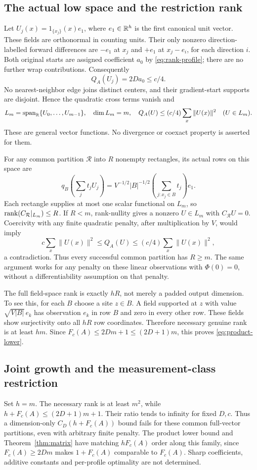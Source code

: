 \subsection{The actual low space and the restriction rank}
Let $U_j(x)=1_{\{x_j\}}(x)e_1$, where $e_1\in\mathbb R^h$ is the first
canonical unit vector. These fields are orthonormal in counting units.
Their only nonzero direction-labelled forward differences are $-e_1$ at
$x_j$ and $+e_1$ at $x_j-e_i$, for each direction $i$. Both original
starts are assigned coefficient $a_0$ by \eqref{eq:rank-profile}; there
are no further wrap contributions. Consequently
\[
 Q_A(U_j)=2Da_0\le c/4.
\]
No nearest-neighbor edge joins distinct centers, and their gradient-start
supports are disjoint. Hence the quadratic cross terms vanish and
\begin{equation}\label{eq:rank-lowspace}
 L_m=\operatorname{span}_{\mathbb R}\{U_0,\ldots,U_{m-1}\},\quad
 \dim L_m=m,\quad
 Q_A(U)\le(c/4)\sum_x\|U(x)\|^2\quad(U\in L_m).
\end{equation}
These are general vector functions. No divergence or coexact property is
asserted for them.

For any common partition $\mathcal R$ into $R$ nonempty rectangles, its
actual rows on this space are
\[
 q_B\left(\sum_jt_jU_j\right)
 =V^{-1/2}|B|^{-1/2}
       \left(\sum_{j:x_j\in B}t_j\right)e_1.
\]
Each rectangle supplies at most one scalar functional on $L_m$, so
$\operatorname{rank}(C_{\mathcal R}|_{L_m})\le R$. If $R<m$, rank-nullity gives a
nonzero $U\in L_m$ with $C_{\mathcal R}U=0$. Coercivity with any finite
quadratic penalty, after multiplication by $V$, would imply
\[
 c\sum_x\|U(x)\|^2\le Q_A(U)
                    \le(c/4)\sum_x\|U(x)\|^2,
\]
a contradiction. Thus every successful common partition has $R\ge m$.
The same argument works for any penalty on these linear observations with
$\Phi(0)=0$, without a differentiability assumption on that penalty.

The full field-space rank is exactly $hR$, not merely a padded output
dimension. To see this, for each $B$ choose a site $z\in B$. A field
supported at $z$ with value $\sqrt{V|B|}\,e_k$ has observation $e_k$ in
row $B$ and zero in every other row. These fields show surjectivity onto
all $hR$ row coordinates. Therefore necessary genuine rank is at least
$hm$. Since $F_c(A)\le2Dm+1\le(2D+1)m$, this proves
\eqref{eq:product-lower}.

\subsection{Joint growth and the measurement-class restriction}
Set $h=m$. The necessary rank is at least $m^2$, while
$h+F_c(A)\le(2D+1)m+1$. Their ratio tends to infinity for fixed $D,c$.
Thus a dimension-only $C_D(h+F_c(A))$ bound fails for these common
full-vector partitions, even with arbitrary finite penalty. The product
lower bound and Theorem~\ref{thm:matrix} have matching $hF_c(A)$ order
along this family, since $F_c(A)\ge2Dm$ makes $1+F_c(A)$ comparable to
$F_c(A)$. Sharp coefficients, additive constants and per-profile optimality
are not determined.

